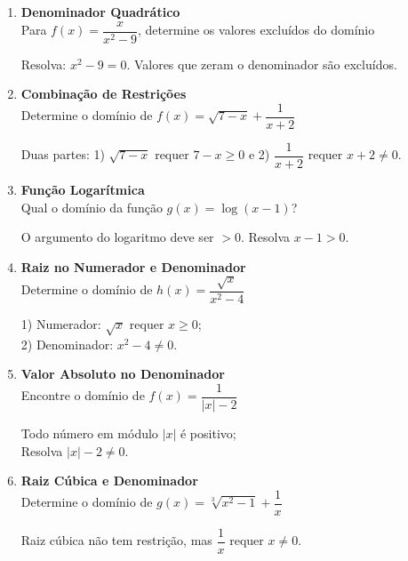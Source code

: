 \documentclass[11pt]{article}
\begin{document}
\begin{multicols}{2}
\begin{enumerate}
\item \textbf{Denominador Quadrático}\\
Para $f(x) = \dfrac{x}{x^2-9}$, determine os valores excluídos do domínio
\begin{tcolorbox}[colback=explanationbg,colframe=titleblue,title=Dica:]
Resolva: $x^2-9 = 0$. Valores que zeram o denominador são excluídos.
\end{tcolorbox}

\item \textbf{Combinação de Restrições}\\
Determine o domínio de $f(x) = \sqrt{7-x} + \dfrac{1}{x+2}$
\begin{tcolorbox}[colback=explanationbg,colframe=titleblue,title=Dica:]
Duas partes: 1) $\sqrt{7-x}$ requer $7-x \geq 0$ e 2) $\dfrac{1}{x+2}$ requer $x+2 \neq 0$.
\end{tcolorbox}

\item \textbf{Função Logarítmica}\\
Qual o domínio da função $g(x) = \log(x-1)$?
\begin{tcolorbox}[colback=explanationbg,colframe=titleblue,title=Dica:]
O argumento do logaritmo deve ser $> 0$. Resolva $x-1 > 0$.
\end{tcolorbox}

\item \textbf{Raiz no Numerador e Denominador}\\
Determine o domínio de $h(x) = \dfrac{\sqrt{x}}{x^2-4}$
\begin{tcolorbox}[colback=explanationbg,colframe=titleblue,title=Dica:]
1) Numerador: $\sqrt{x}$ requer $x \geq 0$; \\  2) Denominador: $x^2-4 \neq 0$.
\end{tcolorbox}

\item \textbf{Valor Absoluto no Denominador}\\
Encontre o domínio de $f(x) = \dfrac{1}{|x|-2}$
\begin{tcolorbox}[colback=explanationbg,colframe=titleblue,title=Dica:]
Todo número em módulo $|x|$ é positivo; \\
Resolva $|x|-2 \neq 0$.
\end{tcolorbox}

\item \textbf{Raiz Cúbica e Denominador}\\
Determine o domínio de $g(x) = \sqrt[3]{x^2-1} + \dfrac{1}{x}$
\begin{tcolorbox}[colback=explanationbg,colframe=titleblue,title=Dica:]
Raiz cúbica não tem restrição, mas $\dfrac{1}{x}$ requer $x \neq 0$.
\end{tcolorbox}


\end{enumerate}
\end{multicols}
\end{document}
